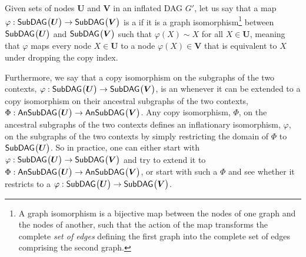 Given sets of nodes $\bm{U}$ and $\bm{V}$ in an inflated DAG $G'$, let us say that a map $\varphi:{\operatorname{\mathsf{SubDAG}}_{}}\bigl\lparen\bm{U}\bigr\rparen\to{\operatorname{\mathsf{SubDAG}}_{}}\bigl\lparen\bm{V}\bigr\rparen$ is a  if it is a graph isomorphism\footnote{A graph isomorphism is a bijective map between the nodes of one graph and the nodes of another, such that the action of the map transforms the complete \emph{set of edges} defining the first graph into the complete set of edges comprising the second graph.} between ${\operatorname{\mathsf{SubDAG}}_{}}\bigl\lparen\bm{U}\bigr\rparen$ and ${\operatorname{\mathsf{SubDAG}}_{}}\bigl\lparen\bm{V}\bigr\rparen$ such that $\varphi(X)\sim X$ for all $X\in\bm{U}$, meaning that $\varphi$ maps every node $X\in\bm{U}$ to a node $\varphi(X)\in\bm{V}$ that is equivalent to $X$ under dropping the copy index. %


Furthermore, we say that a copy isomorphism on the subgraphs of the two contexts, $\varphi : {\operatorname{\mathsf{SubDAG}}_{}}\bigl\lparen\bm{U}\bigr\rparen\to{\operatorname{\mathsf{SubDAG}}_{}}\bigl\lparen\bm{V}\bigr\rparen$, is an  whenever it can be extended to a copy isomorphism on their ancestral subgraphs of the two contexts, $\Phi : {\operatorname{\mathsf{AnSubDAG}}_{}}\bigl\lparen\bm{U}\bigr\rparen\to{\operatorname{\mathsf{AnSubDAG}}_{}}\bigl\lparen\bm{V}\bigr\rparen$. %
Any copy isomorphism, $\Phi$, on the ancestral subgraphs of the two contexts defines an inflationary isomorphism, $\varphi$, on the subgraphs of the two contexts by simply restricting the domain of $\Phi$ to ${\operatorname{\mathsf{SubDAG}}_{}}\bigl\lparen\bm{U}\bigr\rparen$.
So in practice, one can either start with $\varphi : {\operatorname{\mathsf{SubDAG}}_{}}\bigl\lparen\bm{U}\bigr\rparen\to{\operatorname{\mathsf{SubDAG}}_{}}\bigl\lparen\bm{V}\bigr\rparen$ and try to extend it to $\Phi : {\operatorname{\mathsf{AnSubDAG}}_{}}\bigl\lparen\bm{U}\bigr\rparen\to{\operatorname{\mathsf{AnSubDAG}}_{}}\bigl\lparen\bm{V}\bigr\rparen$, or start with such a $\Phi$ and see whether it restricts to a $\varphi:{\operatorname{\mathsf{SubDAG}}_{}}\bigl\lparen\bm{U}\bigr\rparen\to{\operatorname{\mathsf{SubDAG}}_{}}\bigl\lparen\bm{V}\bigr\rparen$.


